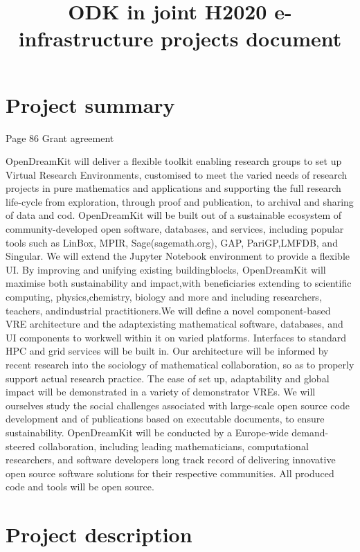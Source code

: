 \documentclass[12pt]{amsbook}
\title{ODK in joint H2020 e-infrastructure projects document}
\begin{document}
\maketitle

\section{Project summary}

Page 86 Grant agreement


OpenDreamKit will deliver a flexible toolkit enabling research groups to set up Virtual Research Environments,
customised to meet the varied needs of research projects in pure mathematics and applications and supporting
the full research life-cycle from exploration, through proof and publication, to archival and sharing of data and
cod. OpenDreamKit will be built out of a sustainable ecosystem of community-developed open software, databases,
and services, including popular tools such as LinBox, MPIR, Sage(sagemath.org), GAP, PariGP,LMFDB, and
Singular. We will extend the Jupyter Notebook environment to provide a flexible UI. By improving and unifying
existing buildingblocks, OpenDreamKit will maximise both sustainability and impact,with beneficiaries extending
to scientific computing, physics,chemistry, biology and more and including researchers, teachers, andindustrial
practitioners.We will define a novel component-based VRE architecture and the adaptexisting mathematical software,
databases, and UI components to workwell within it on varied platforms. Interfaces to standard HPC and  grid
services will be built in. Our architecture will be informed by recent research into the sociology of mathematical
collaboration, so as to properly support actual research practice. The ease of set up, adaptability and global impact
will be demonstrated in a variety of demonstrator VREs. We will ourselves study the social challenges associated
with large-scale open source code development and of publications based on executable documents, to ensure
sustainability. OpenDreamKit will be conducted by a Europe-wide demand-steered collaboration, including leading
mathematicians, computational researchers, and software developers long track record of delivering innovative open
source software solutions for their respective communities. All produced code and tools will be open source.

\section{Project description}
\end{document}
